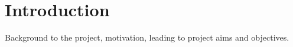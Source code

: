 \chapter{Introduction}

Background to the project, motivation, leading to project aims and objectives.